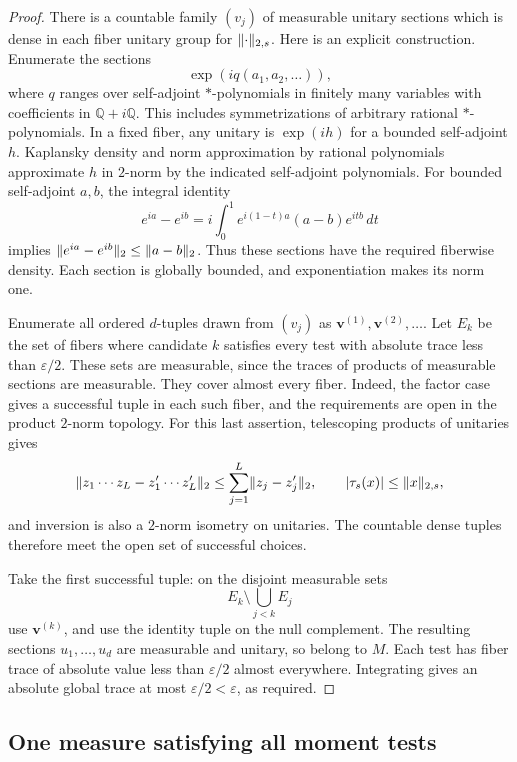 \begin{proof}
There is a countable family $(v_j)$ of measurable unitary sections
which is dense in each fiber unitary group for
$\lVert\cdot\rVert_{2,s}$.  Here is an explicit construction.  Enumerate the
sections
\[
 \exp(iq(a_1,a_2,\ldots)),
\]
where $q$ ranges over self-adjoint $*$-polynomials in finitely many
variables with coefficients in $\mathbb Q+i\mathbb Q$.  This includes
symmetrizations of arbitrary rational $*$-polynomials.  In a fixed
fiber, any unitary is $\exp(ih)$ for a bounded self-adjoint $h$.
Kaplansky density and norm approximation by rational polynomials
approximate $h$ in $2$-norm by the indicated self-adjoint polynomials.
For bounded self-adjoint $a,b$, the integral identity
\[
 e^{ia}-e^{ib}
 =i\int_0^1 e^{i(1-t)a}(a-b)e^{itb}\,dt
\]
implies $\lVert e^{ia}-e^{ib}\rVert_2\leq\lVert a-b\rVert_2$.
Thus these sections have the required fiberwise density.  Each section
is globally bounded, and exponentiation makes its norm one.

Enumerate all ordered $d$-tuples drawn from $(v_j)$ as
$\boldsymbol v^{(1)},\boldsymbol v^{(2)},\ldots$.  Let $E_k$ be the
set of fibers where candidate $k$ satisfies every test with absolute
trace less than $\varepsilon/2$.  These sets are measurable, since
the traces of products of measurable sections are measurable.  They
cover almost every fiber.  Indeed, the factor case gives a successful
tuple in each such fiber, and the requirements are open in the product
$2$-norm topology.  For this last assertion, telescoping products of
unitaries gives
\[
 \lVert z_1\cdots z_L-z'_1\cdots z'_L\rVert_2
 \leq\sum_{j=1}^L\lVert z_j-z'_j\rVert_2,
 \qquad |\tau_s(x)|\leq\lVert x\rVert_{2,s},
\]
and inversion is also a $2$-norm isometry on unitaries.  The countable
dense tuples therefore meet the open set of successful choices.

Take the first successful tuple: on the disjoint measurable sets
\[
 E_k\setminus\bigcup_{j<k}E_j
\]
use $\boldsymbol v^{(k)}$, and use the identity tuple on the null
complement.  The resulting sections $u_1,\ldots,u_d$ are measurable
and unitary, so belong to $M$.  Each test has fiber trace of absolute
value less than $\varepsilon/2$ almost everywhere.  Integrating gives
an absolute global trace at most $\varepsilon/2<\varepsilon$, as
required.
\end{proof}

\subsection{One measure satisfying all moment tests}

